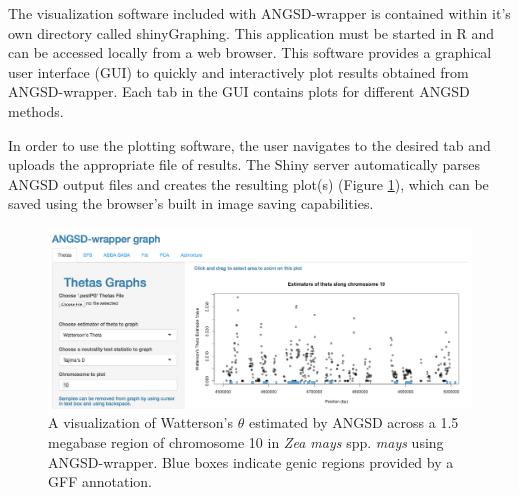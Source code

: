\documentclass[10pt,a4paper]{article}
\newcommand{\jri}[1]{\todo[size=\scriptsize, color=flame]{#1}}
\begin{document}
The visualization software included with ANGSD-wrapper is contained within it's own directory called shinyGraphing.
This application must be started in R and can be accessed locally from a web browser. This software provides a graphical user interface (GUI) to quickly and interactively plot results obtained from ANGSD-wrapper.  
Each tab in the GUI contains plots for different ANGSD methods.

In order to use the plotting software, the user navigates to the desired tab and uploads the appropriate file of results. 
The Shiny server automatically parses ANGSD output files and creates the resulting plot(s) (Figure \ref{fig:theta}), which can be saved using the browser's built in image saving capabilities. %

\begin{figure}
\centering
\includegraphics[width=130mm]{figures/fig1.png}
\caption{A visualization of Watterson's $\theta$ estimated by ANGSD across a 1.5 megabase region of chromosome 10 in {\it Zea mays} spp. {\it mays} using ANGSD-wrapper. Blue boxes indicate genic regions provided by a GFF annotation. \label{fig:theta} }
\end{figure}
\end{document}
